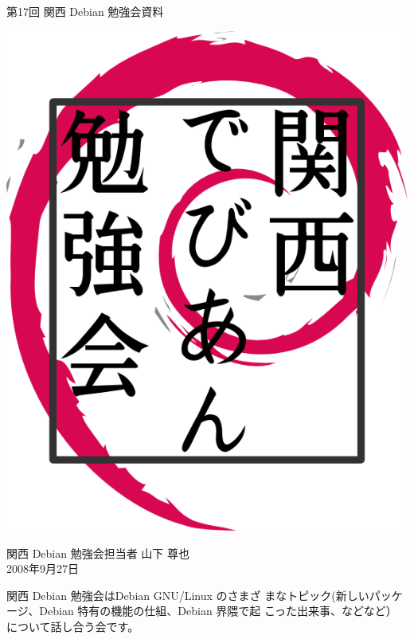 \documentclass[mingoth,a4paper]{jsarticle}
\newcommand{\debmtgyear}{2008}
\newcommand{\debmtgdate}{27}
\newcommand{\debmtgmonth}{9}
\newcommand{\debmtgnumber}{17}
\begin{document}
\begin{titlepage}


 第\debmtgnumber{}回 関西 Debian 勉強会資料

\vspace{2cm}

\begin{center}
\includegraphics{image200802/kansaidebianlogo.png}
\end{center}

\begin{flushright}
\hfill{}関西 Debian 勉強会担当者 山下 尊也\\
\hfill{}\debmtgyear{}年\debmtgmonth{}月\debmtgdate{}日
\end{flushright}

\thispagestyle{empty}
\end{titlepage}

 
 関西 Debian 勉強会はDebian GNU/Linux のさまざ
 まなトピック(新しいパッケージ、Debian 特有の機能の仕組、Debian 界隈で起
 こった出来事、などなど）について話し合う会です。
\end{document}
